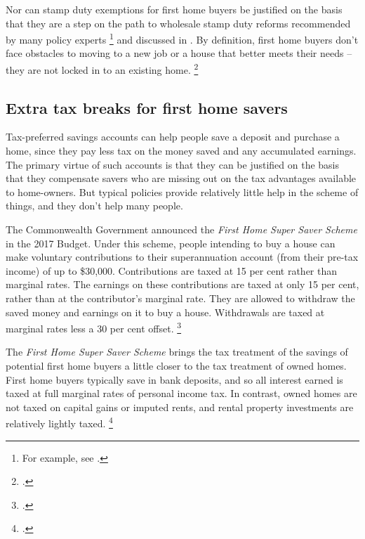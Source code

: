 Nor can stamp duty exemptions for first home buyers be justified on the basis that they are a step on the path to wholesale stamp duty reforms recommended by many policy experts%
	\footnote{For example, see \textcites{HenryTaxReview2010}{DaleyCoates-2015-Property-taxes}.}
and discussed in .
By definition, first home buyers don't face obstacles to moving to a new job or a house that better meets their needs -- they are not locked in to an existing home.%
	\footcite[][9]{Stevens-2017-Report-to-NSW-Premier-Housing-affordaibility}

\subsection{Extra tax breaks for first home savers }\label{subsec:extra-tax-breaks-for-first-home-savers}

Tax-preferred savings accounts can help people save a deposit and purchase a home, since they pay less tax on the money saved and any accumulated earnings.
The primary virtue of such accounts is that they can be justified on the basis that they compensate savers who are missing out on the tax advantages available to home-owners.
But typical policies provide relatively little help in the scheme of things, and they don't help many people.

The Commonwealth Government announced the \textit{First Home Super Saver Scheme} in the 2017 Budget.
Under this scheme, people intending to buy a house can make voluntary contributions to their superannuation account (from their pre-tax income) of up to \$30,000.
Contributions are taxed at 15 per cent rather than marginal rates.
The earnings on these contributions are taxed at only 15 per cent, rather than at the contributor's marginal rate.
They are allowed to withdraw the saved money and earnings on it to buy a house.
Withdrawals are taxed at marginal rates less a 30 per cent offset.%
    \footcite{ATO-2017-First-home-super-save-scheme}

The \textit{First Home Super Saver Scheme} brings the tax treatment of the savings of potential first home buyers a little closer to the tax treatment of owned homes.
First home buyers typically save in bank deposits, and so all interest earned is taxed at full marginal rates of personal income tax.
In contrast, owned homes are not taxed on capital gains or imputed rents, and rental property investments are relatively lightly taxed.%
	\footcite[][18]{DaleyCoatesWood-2015-Super-tax-targeting}

